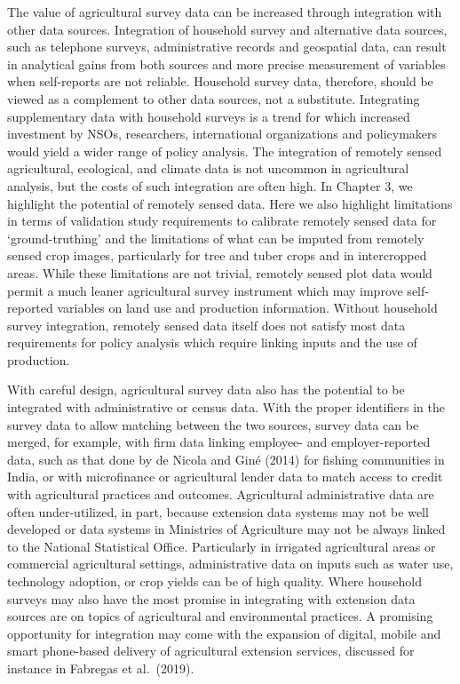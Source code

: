 \documentclass[
]{book}
\begin{document}
The value of agricultural survey data can be increased through integration with other data sources. Integration of household survey and alternative data sources, such as telephone surveys, administrative records and geospatial data, can result in analytical gains from both sources and more precise measurement of variables when self-reports are not reliable. Household survey data, therefore, should be viewed as a complement to other data sources, not a substitute. Integrating supplementary data with household surveys is a trend for which increased investment by NSOs, researchers, international organizations and policymakers would yield a wider range of policy analysis. The integration of remotely sensed agricultural, ecological, and climate data is not uncommon in agricultural analysis, but the costs of such integration are often high. In Chapter 3, we highlight the potential of remotely sensed data. Here we also highlight limitations in terms of validation study requirements to calibrate remotely sensed data for `ground-truthing' and the limitations of what can be imputed from remotely sensed crop images, particularly for tree and tuber crops and in intercropped areas. While these limitations are not trivial, remotely sensed plot data would permit a much leaner agricultural survey instrument which may improve self-reported variables on land use and production information. Without household survey integration, remotely sensed data itself does not satisfy most data requirements for policy analysis which require linking inputs and the use of production.

With careful design, agricultural survey data also has the potential to be integrated with administrative or census data. With the proper identifiers in the survey data to allow matching between the two sources, survey data can be merged, for example, with firm data linking employee- and employer-reported data, such as that done by de Nicola and Giné (2014) for fishing communities in India, or with microfinance or agricultural lender data to match access to credit with agricultural practices and outcomes. Agricultural administrative data are often under-utilized, in part, because extension data systems may not be well developed or data systems in Ministries of Agriculture may not be always linked to the National Statistical Office. Particularly in irrigated agricultural areas or commercial agricultural settings, administrative data on inputs such as water use, technology adoption, or crop yields can be of high quality. Where household surveys may also have the most promise in integrating with extension data sources are on topics of agricultural and environmental practices. A promising opportunity for integration may come with the expansion of digital, mobile and smart phone-based delivery of agricultural extension services, discussed for instance in Fabregas et al.~(2019).
\end{document}

